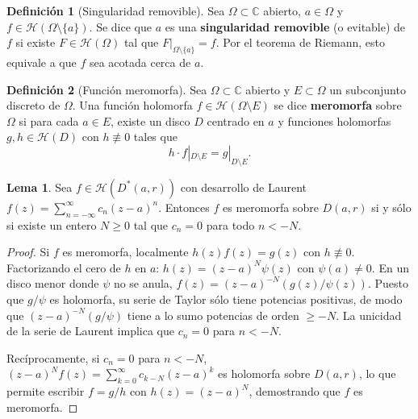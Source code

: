 \documentclass[11pt,a4paper]{article}
\theoremstyle{definition}
\newtheorem{definicion}{Definición}[section]
\newtheorem{lema}{Lema}[section]
\theoremstyle{remark}
\numberwithin{equation}{section}
\begin{document}
\begin{definicion}[Singularidad removible]
Sea $\Omega \subset \mathbb{C}$ abierto, $a \in \Omega$ y $f \in \mathcal{H}(\Omega \setminus \{a\})$. Se dice que $a$ es una \textbf{singularidad removible} (o evitable) de $f$ si existe $F \in \mathcal{H}(\Omega)$ tal que $F|_{\Omega \setminus \{a\}} = f$. Por el teorema de Riemann, esto equivale a que $f$ sea acotada cerca de $a$.
\end{definicion}

\begin{definicion}[Función meromorfa]
Sea $\Omega \subset \mathbb{C}$ abierto y $E \subset \Omega$ un subconjunto discreto de $\Omega$. Una función holomorfa $f \in \mathcal{H}(\Omega \setminus E)$ se dice \textbf{meromorfa} sobre $\Omega$ si para cada $a \in E$, existe un disco $D$ centrado en $a$ y funciones holomorfas $g, h \in \mathcal{H}(D)$ con $h \not\equiv 0$ tales que
\begin{equation}
h \cdot f|_{D \setminus E} = g|_{D \setminus E}.
\end{equation}
\end{definicion}

\begin{lema}
Sea $f \in \mathcal{H}(D^*(a,r))$ con desarrollo de Laurent $f(z) = \sum_{n=-\infty}^\infty c_n (z-a)^n$. Entonces $f$ es meromorfa sobre $D(a,r)$ si y sólo si existe un entero $N \ge 0$ tal que $c_n = 0$ para todo $n < -N$.
\end{lema}
\begin{proof}
Si $f$ es meromorfa, localmente $h(z) f(z) = g(z)$ con $h \not\equiv 0$. Factorizando el cero de $h$ en $a$: $h(z) = (z-a)^N \psi(z)$ con $\psi(a) \neq 0$. En un disco menor donde $\psi$ no se anula, $f(z) = (z-a)^{-N} (g(z)/\psi(z))$. Puesto que $g/\psi$ es holomorfa, su serie de Taylor sólo tiene potencias positivas, de modo que $(z-a)^{-N} (g/\psi)$ tiene a lo sumo potencias de orden $\ge -N$. La unicidad de la serie de Laurent implica que $c_n = 0$ para $n < -N$.

Recíprocamente, si $c_n = 0$ para $n < -N$, $(z-a)^N f(z) = \sum_{k=0}^\infty c_{k-N} (z-a)^k$ es holomorfa sobre $D(a,r)$, lo que permite escribir $f = g/h$ con $h(z) = (z-a)^N$, demostrando que $f$ es meromorfa.
\end{proof}
\end{document}
